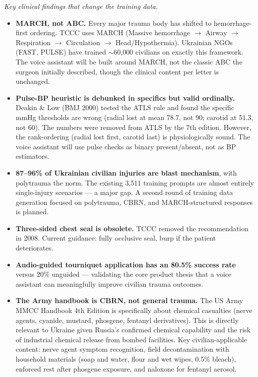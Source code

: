 \documentclass{article}
\theoremstyle{plain}
\theoremstyle{definition}
\theoremstyle{remark}
\begin{document}
\textit{Key clinical findings that change the training data.}
\begin{itemize}
\item \textbf{MARCH, not ABC.} Every major trauma body has shifted to hemorrhage-first ordering. TCCC uses MARCH (Massive hemorrhage $\rightarrow$ Airway $\rightarrow$ Respiration $\rightarrow$ Circulation $\rightarrow$ Head/Hypothermia). Ukrainian NGOs (FAST, PULSE) have trained $\sim$60{,}000 civilians on exactly this framework. The voice assistant will be built around MARCH, not the classic ABC the surgeon initially described, though the clinical content per letter is unchanged.
\item \textbf{Pulse-BP heuristic is debunked in specifics but valid ordinally.} Deakin \& Low (BMJ 2000) tested the ATLS rule and found the specific mmHg thresholds are wrong (radial lost at mean 78.7, not 90; carotid at 51.3, not 60). The numbers were removed from ATLS by the 7th edition. However, the rank-ordering (radial lost first, carotid last) is physiologically sound. The voice assistant will use pulse checks as binary present/absent, not as BP estimators.
\item \textbf{87--96\% of Ukrainian civilian injuries are blast mechanism}, with polytrauma the norm. The existing 3{,}511 training prompts are almost entirely single-injury scenarios --- a major gap. A second round of training data generation focused on polytrauma, CBRN, and MARCH-structured responses is planned.
\item \textbf{Three-sided chest seal is obsolete.} TCCC removed the recommendation in 2008. Current guidance: fully occlusive seal, burp if the patient deteriorates.
\item \textbf{Audio-guided tourniquet application has an 80.5\% success rate} versus 20\% unguided --- validating the core product thesis that a voice assistant can meaningfully improve civilian trauma outcomes.
\item \textbf{The Army handbook is CBRN, not general trauma.} The US Army MMCC Handbook 4th Edition is specifically about chemical casualties (nerve agents, cyanide, mustard, phosgene, fentanyl derivatives). This is directly relevant to Ukraine given Russia's confirmed chemical capability and the risk of industrial chemical release from bombed facilities. Key civilian-applicable content: nerve agent symptom recognition, field decontamination with household materials (soap and water, flour and wet wipes, 0.5\% bleach), enforced rest after phosgene exposure, and naloxone for fentanyl aerosol.
\end{itemize}
\end{document}
